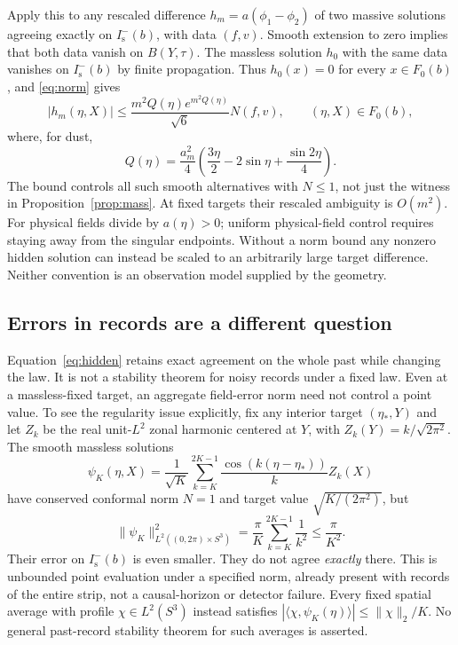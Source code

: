 \documentclass[11pt]{article}
\theoremstyle{definition}
\newcommand{\Is}{I^-_{\mathrm s}}
\begin{document}
Apply this to any rescaled difference $h_m=a(\phi_1-\phi_2)$ of two massive
solutions agreeing exactly on $\Is(b)$, with data $(f,v)$. Smooth extension to zero
implies that both data vanish on $B(Y,\tau)$. The massless solution $h_0$
with the same data vanishes on $\Is(b)$ by finite propagation. Thus
$h_0(x)=0$ for every $x\in F_0(b)$, and \eqref{eq:norm} gives
\begin{equation}\label{eq:hidden}
 |h_m(\eta,X)|\le
 \frac{m^2Q(\eta)e^{m^2Q(\eta)}}{\sqrt6}N(f,v),
 \qquad (\eta,X)\in F_0(b),
\end{equation}
where, for dust,
\[
 Q(\eta)=\frac{a_m^2}{4}
 \left(\frac{3\eta}{2}-2\sin\eta+\frac{\sin2\eta}{4}\right).
\]
The bound controls all such smooth alternatives with $N\le1$, not just the
witness in Proposition~\ref{prop:mass}. At fixed targets their rescaled
ambiguity is $O(m^2)$. For physical fields divide by $a(\eta)>0$; uniform
physical-field control requires staying away from the singular endpoints.
Without a norm bound any nonzero hidden solution can instead be scaled to
an arbitrarily large target difference. Neither convention is an observation
model supplied by the geometry.

\subsection{Errors in records are a different question}

Equation~\eqref{eq:hidden} retains exact agreement on the whole past while
changing the law. It is not a stability theorem for noisy records under a
fixed law. Even at a massless-fixed target, an aggregate field-error norm
need not control a point value. To see the regularity issue explicitly, fix
any interior target $(\eta_*,Y)$ and let $Z_k$ be the real unit-$L^2$ zonal
harmonic centered at $Y$, with $Z_k(Y)=k/\sqrt{2\pi^2}$. The smooth massless
solutions
\[
 \psi_K(\eta,X)=\frac1{\sqrt K}
  \sum_{k=K}^{2K-1}\frac{\cos(k(\eta-\eta_*))}{k}Z_k(X)
\]
have conserved conformal norm $N=1$ and target value
$\sqrt{K/(2\pi^2)}$, but
\[
 \|\psi_K\|_{L^2((0,2\pi)\times S^3)}^2
 =\frac\pi K\sum_{k=K}^{2K-1}\frac1{k^2}\le\frac\pi{K^2}.
\]
Their error on $\Is(b)$ is even smaller. They do not agree \emph{exactly}
there. This is unbounded point evaluation under a specified norm, already
present with records of the entire strip, not a causal-horizon or detector
failure. Every fixed spatial average with profile $\chi\in L^2(S^3)$ instead
satisfies $|\langle\chi,\psi_K(\eta)\rangle|\le\|\chi\|_2/K$.
No general past-record stability theorem for such averages is asserted.
\end{document}

